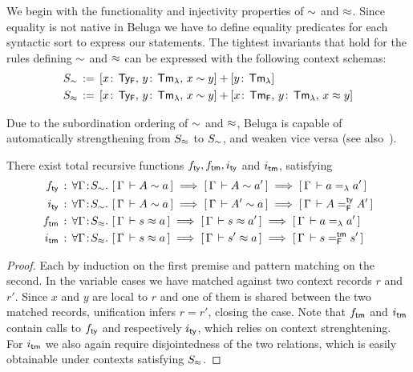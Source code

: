 We begin with the functionality and injectivity properties of $\mathrel{\sim}$ and $\mathrel{\approx}$.
Since equality is not native in Beluga we have to define equality predicates for each syntactic sort to express our statements. The tightest invariants that hold for the rules defining $\mathrel{\sim}$ and $\mathrel{\approx}$ can be expressed with the following context schemas:
\begin{align*}
  S_{\mathrel{\sim}} &\mathrel{\, := \,} [x\!:\,\mathsf{Ty_{F}} ,\, y\!:\,\mathsf{Tm_{\lambda}} ,\, x \mathrel{\sim} y] + [y\!:\,\mathsf{Tm_{\lambda}}]\\
  S_{\mathrel{\approx}} &\mathrel{\, := \,} [x\!:\,\mathsf{Ty_{F}} ,\, y\!:\,\mathsf{Tm_{\lambda}} ,\, x \mathrel{\sim} y] + [x\!:\,\mathsf{Tm_{F}} ,\, y\!:\,\mathsf{Tm_{\lambda}} ,\, x \mathrel{\approx} y]
\end{align*}

Due to the subordination ordering of $\mathrel{\sim}$ and $\mathrel{\approx}$, Beluga is capable of automatically strengthening from $S_{\mathrel{\approx}}$ to $S_{\mathrel{\sim}}$, and weaken vice versa (see also~\cite{Virga99phd}).
\begin{lemma}
  There exist total recursive functions $f_{\mathsf{ty}}, f_{\mathsf{tm}}, i_{\mathsf{ty}}$ and $i_{\mathsf{tm}}$, satisfying
  \begin{align*}
    f_{\ty} &\OF  \mAll{\Gamma \of S_{\tyr}} \bc{\Gamma}{A \tyr a} \implies \bc{\Gamma}{A \tyr a'} \implies \bc{\Gamma}{a =_{\lambda} a'}\\
    i_{\ty} &\OF  \mAll{\Gamma \of S_{\tyr}} \bc{\Gamma}{A \tyr a} \implies \bc{\Gamma}{A' \tyr a} \implies \bc{\Gamma}{A =^{\ty}_{\mathsf{F}} A'}\\
    f_{\tm} &\OF  \mAll{\Gamma \of S_{\tmr}} \bc{\Gamma}{s \tmr a} \implies \bc{\Gamma}{s \tmr a'} \implies \bc{\Gamma}{a =_{\lambda} a'}\\
    i_{\tm} &\OF  \mAll{\Gamma \of S_{\tmr}} \bc{\Gamma}{s \tmr a} \implies \bc{\Gamma}{s' \tmr a} \implies \bc{\Gamma}{s =^{\tm}_{\mathsf{F}} s'}
\end{align*}
\end{lemma}
\begin{proof}
  Each by induction on the first premise and pattern matching on the second.
  In the variable cases we have matched against two context records $r$ and $r'$.
  Since $x$ and $y$ are local to $r$ and one of them is shared between the two matched records, unification infers $r = r'$, closing the case.
  Note that $f_{\mathsf{tm}}$ and $i_{\mathsf{tm}}$ contain calls to $f_{\mathsf{ty}}$ and respectively $i_{\mathsf{ty}}$, which relies on context strenghtening.
  For $i_{\mathsf{tm}}$ we also again require disjointedness of the two relations, which is easily obtainable under contexts satisfying $S_{\mathrel{\approx}}$.
\end{proof}

